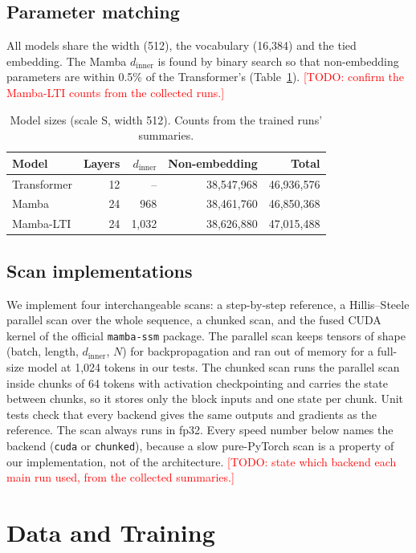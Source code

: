 \documentclass[conference]{IEEEtran}
\newcommand{\todo}[1]{\textcolor{red}{[TODO: #1]}}
\begin{document}
\subsection{Parameter matching}
All models share the width (512), the vocabulary (16,384) and the tied embedding. The Mamba
$d_\text{inner}$ is found by binary search so that non-embedding parameters are within 0.5\% of the
Transformer's (Table~\ref{tab:params}). \todo{confirm the Mamba-LTI counts from the collected runs.}

\begin{table}[t]
\centering
\caption{Model sizes (scale S, width 512). Counts from the trained runs' summaries.}
\label{tab:params}
\begin{tabular}{lrrrr}
\toprule
Model & Layers & $d_\text{inner}$ & Non-embedding & Total \\
\midrule
Transformer & 12 & -- & 38,547,968 & 46,936,576 \\
Mamba & 24 & 968 & 38,461,760 & 46,850,368 \\
Mamba-LTI & 24 & 1,032 & 38,626,880 & 47,015,488 \\
\bottomrule
\end{tabular}
\end{table}

\subsection{Scan implementations}
We implement four interchangeable scans: a step-by-step reference, a Hillis--Steele parallel scan over
the whole sequence, a chunked scan, and the fused CUDA kernel of the official \texttt{mamba-ssm}
package. The parallel scan keeps tensors of shape (batch, length, $d_\text{inner}$, $N$) for
backpropagation and ran out of memory for a full-size model at 1,024 tokens in our tests. The chunked
scan runs the parallel scan inside chunks of 64 tokens with activation checkpointing and carries the
state between chunks, so it stores only the block inputs and one state per chunk. Unit tests check that
every backend gives the same outputs and gradients as the reference. The scan always runs in fp32.
Every speed number below names the backend (\texttt{cuda} or \texttt{chunked}), because a slow
pure-PyTorch scan is a property of our implementation, not of the architecture.
\todo{state which backend each main run used, from the collected summaries.}

\section{Data and Training}
\end{document}
